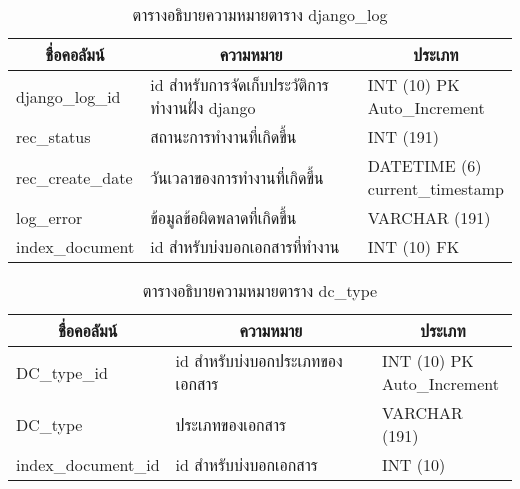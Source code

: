 \begin{table}[H]
\caption{ตารางอธิบายความหมายตาราง django\_log}\label{tbl:djangolog}
\begin{tabular}{|l|l|l|}
\hline
\multicolumn{1}{|c|}{ชื่อคอลัมน์} & \multicolumn{1}{c|}{ความหมาย}                 & \multicolumn{1}{c|}{ประเภท}                                                       \\ \hline
django\_log\_id                   & id สำหรับการจัดเก็บประวัติการทำงานฝั่ง django & \makecell[l]{INT   (10) PK\\Auto\_Increment}    \\ \hline
rec\_status                       & สถานะการทำงานที่เกิดขึ้น                      & INT   (191)                                                                       \\ \hline
rec\_create\_date                 & วันเวลาของการทำงานที่เกิดขึ้น                 & \makecell[l]{DATETIME   (6)\\current\_timestamp}\\ \hline
log\_error                        & ข้อมูลข้อผิดพลาดที่เกิดขึ้น                   & VARCHAR   (191)                                                                   \\ \hline
index\_document                   & id สำหรับบ่งบอกเอกสารที่ทำงาน                 & INT (10) FK                                                                       \\ \hline
\end{tabular}
\end{table}

\begin{table}[H]
\caption{ตารางอธิบายความหมายตาราง dc\_type}\label{tbl:dctype}
\begin{tabular}{|l|l|l|}
\hline
\multicolumn{1}{|c|}{ชื่อคอลัมน์} & \multicolumn{1}{c|}{ความหมาย}  & \multicolumn{1}{c|}{ประเภท}                                                   \\ \hline
DC\_type\_id                      & id สำหรับบ่งบอกประเภทของเอกสาร & \makecell[l]{INT   (10) PK\\Auto\_Increment} \\ \hline
DC\_type                          & ประเภทของเอกสาร                & VARCHAR   (191)                                                               \\ \hline
index\_document\_id               & id สำหรับบ่งบอกเอกสาร          & INT (10)                                                                      \\ \hline
\end{tabular}
\end{table}


